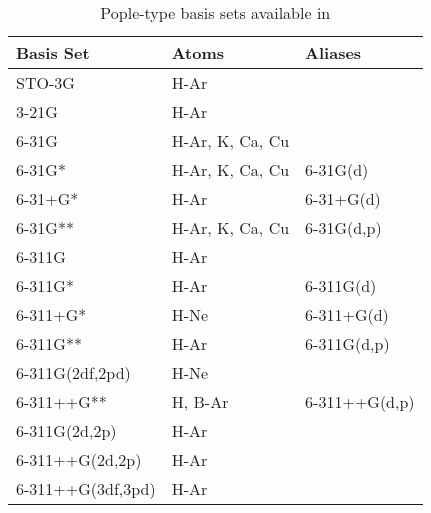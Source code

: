 \begin{table}[p]
\caption{Pople-type basis sets available in \PSIthree}
\label{table:poplebasis}
\begin{center}
\begin{tabular}{|l|l|l|}
\hline
\hline
Basis Set 		&Atoms   	&Aliases\\ 
\hline
	STO-3G			& H-Ar			&\\
	3-21G			& H-Ar			&\\
	6-31G			& H-Ar, K, Ca, Cu	&\\
        6-31G*                  & H-Ar, K, Ca, Cu       &6-31G(d)\\
        6-31+G*                 & H-Ar                  &6-31+G(d)\\
        6-31G**                 & H-Ar, K, Ca, Cu       &6-31G(d,p)\\
	6-311G			& H-Ar			&\\
	6-311G*                 & H-Ar                  &6-311G(d)\\
        6-311+G*                & H-Ne                  &6-311+G(d)\\
	6-311G**                & H-Ar                  &6-311G(d,p)\\
        6-311G(2df,2pd)         & H-Ne                  &\\
	6-311++G**		& H, B-Ar		&6-311++G(d,p)\\
        6-311G(2d,2p)           & H-Ar                  &\\
        6-311++G(2d,2p)         & H-Ar                  &\\
        6-311++G(3df,3pd)       & H-Ar                  &\\
\hline
\hline
\end{tabular}
\end{center}
\end{table}

